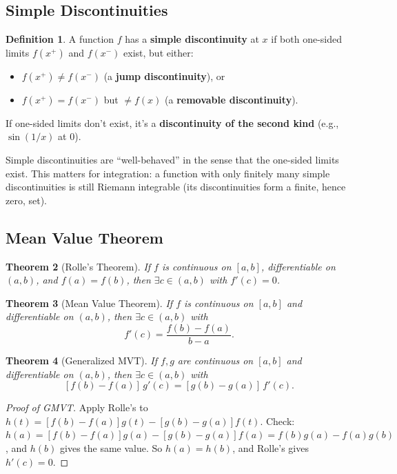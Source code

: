 \documentclass[11pt]{article}
\theoremstyle{myplain}
\newtheorem{theorem}{Theorem}[section]
\theoremstyle{definition}
\newtheorem{definition}[theorem]{Definition}
\theoremstyle{remark}
\begin{document}
\subsection{Simple Discontinuities}

\begin{definition}
A function $f$ has a \textbf{simple discontinuity} at $x$ if both one-sided limits $f(x^+)$ and $f(x^-)$ exist, but either:
\begin{itemize}
  \item $f(x^+) \neq f(x^-)$ (a \textbf{jump discontinuity}), or
  \item $f(x^+) = f(x^-)$ but $\neq f(x)$ (a \textbf{removable discontinuity}).
\end{itemize}
If one-sided limits don't exist, it's a \textbf{discontinuity of the second kind} (e.g., $\sin(1/x)$ at $0$).
\end{definition}

\begin{insight}
Simple discontinuities are ``well-behaved'' in the sense that the one-sided limits exist. This matters for integration: a function with only finitely many simple discontinuities is still Riemann integrable (its discontinuities form a finite, hence zero, set).
\end{insight}

\subsection{Mean Value Theorem}

\begin{theorem}[Rolle's Theorem]
If $f$ is continuous on $[a,b]$, differentiable on $(a,b)$, and $f(a) = f(b)$, then $\exists c \in (a,b)$ with $f'(c) = 0$.
\end{theorem}

\begin{theorem}[Mean Value Theorem]
If $f$ is continuous on $[a,b]$ and differentiable on $(a,b)$, then $\exists c \in (a,b)$ with
$$f'(c) = \frac{f(b) - f(a)}{b - a}.$$
\end{theorem}

\begin{theorem}[Generalized MVT]
If $f, g$ are continuous on $[a,b]$ and differentiable on $(a,b)$, then $\exists c \in (a,b)$ with
$$[f(b) - f(a)]\,g'(c) = [g(b) - g(a)]\,f'(c).$$
\end{theorem}

\begin{proof}[Proof of GMVT]
Apply Rolle's to $h(t) = [f(b)-f(a)]g(t) - [g(b)-g(a)]f(t)$. Check: $h(a) = [f(b)-f(a)]g(a) - [g(b)-g(a)]f(a) = f(b)g(a) - f(a)g(b)$, and $h(b)$ gives the same value. So $h(a) = h(b)$, and Rolle's gives $h'(c) = 0$.
\end{proof}
\end{document}
